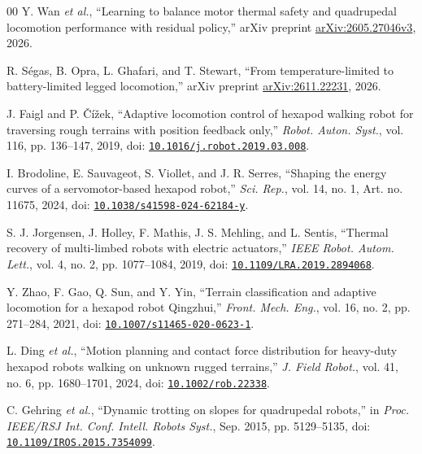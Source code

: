 \documentclass{ieeeaccess}
\begin{document}
\begin{thebibliography}{00}
Y. Wan \emph{et al.}, \textquotedblleft{}Learning to balance motor thermal safety and quadrupedal locomotion performance with residual policy,\textquotedblright{} arXiv preprint \href{https://arxiv.org/abs/2605.27046v3}{arXiv:2605.27046v3}, 2026.

R. Ségas, B. Opra, L. Ghafari, and T. Stewart, \textquotedblleft{}From temperature-limited to battery-limited legged locomotion,\textquotedblright{} arXiv preprint \href{https://arxiv.org/abs/2611.22231}{arXiv:2611.22231}, 2026.

J. Faigl and P. Čížek, \textquotedblleft{}Adaptive locomotion control of hexapod walking robot for traversing rough terrains with position feedback only,\textquotedblright{} \emph{Robot. Auton. Syst.}, vol. 116, pp. 136--147, 2019, doi: \href{https://doi.org/10.1016/j.robot.2019.03.008}{\nolinkurl{10.1016/j.robot.2019.03.008}}.

I. Brodoline, E. Sauvageot, S. Viollet, and J. R. Serres, \textquotedblleft{}Shaping the energy curves of a servomotor-based hexapod robot,\textquotedblright{} \emph{Sci. Rep.}, vol. 14, no. 1, Art. no. 11675, 2024, doi: \href{https://doi.org/10.1038/s41598-024-62184-y}{\nolinkurl{10.1038/s41598-024-62184-y}}.

S. J. Jorgensen, J. Holley, F. Mathis, J. S. Mehling, and L. Sentis, \textquotedblleft{}Thermal recovery of multi-limbed robots with electric actuators,\textquotedblright{} \emph{IEEE Robot. Autom. Lett.}, vol. 4, no. 2, pp. 1077--1084, 2019, doi: \href{https://doi.org/10.1109/LRA.2019.2894068}{\nolinkurl{10.1109/LRA.2019.2894068}}.

Y. Zhao, F. Gao, Q. Sun, and Y. Yin, \textquotedblleft{}Terrain classification and adaptive locomotion for a hexapod robot Qingzhui,\textquotedblright{} \emph{Front. Mech. Eng.}, vol. 16, no. 2, pp. 271--284, 2021, doi: \href{https://doi.org/10.1007/s11465-020-0623-1}{\nolinkurl{10.1007/s11465-020-0623-1}}.

L. Ding \emph{et al.}, \textquotedblleft{}Motion planning and contact force distribution for heavy-duty hexapod robots walking on unknown rugged terrains,\textquotedblright{} \emph{J. Field Robot.}, vol. 41, no. 6, pp. 1680--1701, 2024, doi: \href{https://doi.org/10.1002/rob.22338}{\nolinkurl{10.1002/rob.22338}}.

C. Gehring \emph{et al.}, \textquotedblleft{}Dynamic trotting on slopes for quadrupedal robots,\textquotedblright{} in \emph{Proc. IEEE/RSJ Int. Conf. Intell. Robots Syst.}, Sep. 2015, pp. 5129--5135, doi: \href{https://doi.org/10.1109/IROS.2015.7354099}{\nolinkurl{10.1109/IROS.2015.7354099}}.


\end{thebibliography}
\end{document}
